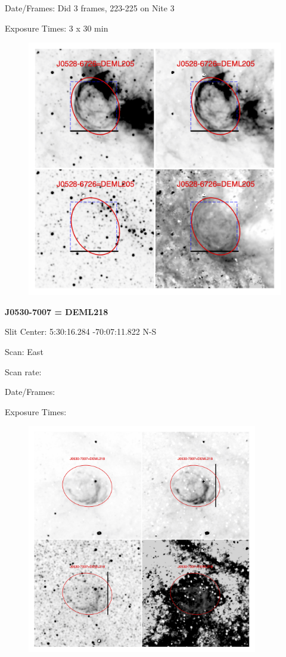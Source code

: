\documentclass[11pt]{article}
\begin{document}
Date/Frames:   Did 3 frames, 223-225 on Nite 3

Exposure Times:   3 x 30 min

\begin{figure}
\includegraphics[width=12.5cm]{snapshots/DEML205.png}
\end{figure}

\newpage
{\bf J0530-7007 = DEML218}  
 
Slit Center:   5:30:16.284   -70:07:11.822 N-S

Scan:  East

Scan rate:  

Date/Frames:

Exposure Times:  

\begin{figure}
\includegraphics[width=10.05cm]{snapshots/J0530-7007.png}
\end{figure}
\end{document}
